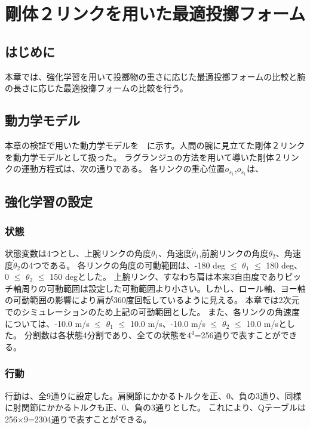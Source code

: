 \chapter[剛体２リンクによる最適投擲シミュレーション]{剛体２リンクを用いた最適投擲フォーム}

\section{はじめに}
本章では、強化学習を用いて投擲物の重さに応じた最適投擲フォームの比較と腕の長さに応じた最適投擲フォームの比較を行う。
\section{動力学モデル}
本章の検証で用いた動力学モデルを　に示す。人間の腕に見立てた剛体２リンクを動力学モデルとして扱った。
ラグランジュの方法を用いて導いた剛体２リンクの運動方程式は、次の通りである。
各リンクの重心位置$o_{s_{1}}$,$o_{s_{1}}$は、\\
\section{強化学習の設定}
\subsection{状態}
状態変数は4つとし、上腕リンクの角度$\theta_{1}$、角速度$\dot{\theta}_{1}$,前腕リンクの角度$\theta_{2}$、角速度$\dot{\theta}_{2}$の4つである。
各リンクの角度の可動範囲は、-180 deg $\le$ $\theta_{1}$ $\le$ 180 deg、0 $\le$ $\theta_{2}$ $\le$ 150 degとした。
上腕リンク、すなわち肩は本来3自由度でありピッチ軸周りの可動範囲は設定した可動範囲より小さい。しかし、ロール軸、ヨー軸の可動範囲の影響により肩が360度回転しているように見える。
本章では2次元でのシミュレーションのため上記の可動範囲とした。
また、各リンクの角速度については、-10.0 m/s $\le$ $\dot{\theta}_{1}$ $\le$ 10.0 m/s、-10.0 m/s $\le$ $\dot{\theta}_{2}$ $\le$ 10.0 m/sとした。
分割数は各状態4分割であり、全ての状態を$4^{4}$=256通りで表すことができる。
\subsection{行動}
行動は、全9通りに設定した。肩関節にかかるトルクを正、0、負の3通り、同様に肘関節にかかるトルクも正、0、負の3通りとした。
これにより、Qテーブルは256$\times$9=2304通りで表すことができる。
